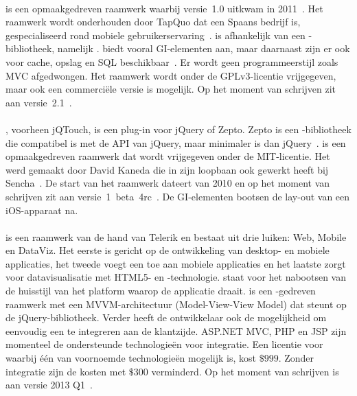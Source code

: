 \paragraph{\lungo} %
\lungo{} is een opmaakgedreven raamwerk waarbij versie~1.0 uitkwam in 2011~\cite{TapQuo2011}.
Het raamwerk wordt onderhouden door TapQuo dat een Spaans bedrijf is, gespecialiseerd rond mobiele gebruikerservaring~\cite{TapQuo2013a}.
\lungo{} is afhankelijk van een \js{}-bibliotheek, namelijk \quo{}.
\lungo{} biedt vooral GI-elementen aan, maar daarnaast zijn er ook  voor cache, opslag en SQL beschikbaar~\cite{TapQuo2013}.
Er wordt geen programmeerstijl zoals MVC afgedwongen.
Het raamwerk wordt onder de GPLv3-licentie vrijgegeven, maar ook een commerciële versie is mogelijk.
Op het moment van schrijven zit \lungo{} aan versie~2.1~\cite{TapQuo2013}.

\paragraph{\jqt}%
\jqt{}, voorheen jQTouch, is een plug-in voor jQuery of Zepto.
Zepto is een \js{}-bibliotheek die compatibel is met de API van jQuery, maar minimaler is dan jQuery~\cite{Zepto2013}.
\jqt{} is een opmaakgedreven raamwerk dat wordt vrijgegeven onder de MIT-licentie.
Het werd gemaakt door David Kaneda die in zijn loopbaan ook gewerkt heeft bij Sencha~\cite{JQT2013,Kaneda2013}.
De start van het raamwerk dateert van 2010 en op het moment van schrijven zit \jqt{} aan versie~1~beta~4rc~\cite{JQTouch2010,JQT2013}.
De GI-elementen bootsen de lay-out van een iOS-apparaat na.

\paragraph{\kendo} %
\kendo{} is een raamwerk van de hand van Telerik en bestaat uit drie luiken:  Web, Mobile en DataViz.
Het eerste is gericht op de ontwikkeling van desktop- en mobiele applicaties,  het tweede voegt een  toe aan mobiele applicaties en het laatste zorgt voor datavisualisatie met HTML5- en \js{}-technologie.
 staat voor het nabootsen van de huisstijl van het platform waarop de applicatie draait.
\kendo{} is een \js{}-gedreven raamwerk met een MVVM-architectuur (Model-View-View Model) dat steunt op de jQuery-bibliotheek.
Verder heeft de ontwikkelaar ook de mogelijkheid om eenvoudig een  te integreren aan de klantzijde.
ASP.NET MVC,  PHP en JSP zijn momenteel de ondersteunde technologieën voor integratie.
Een licentie voor \kendo{} waarbij één van voornoemde technologieën mogelijk is, kost $\$999$.
Zonder  integratie zijn de kosten met $\$300$ verminderd.
Op het moment van schrijven is \kendo{} aan versie 2013 Q1~\cite{Telerike}.

